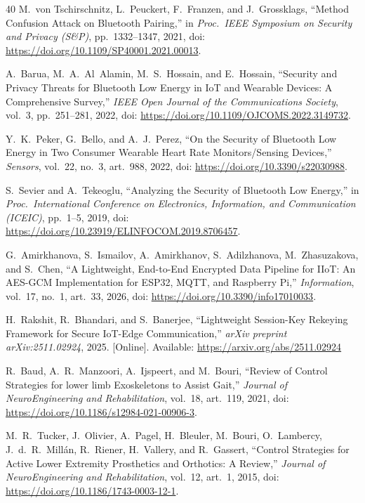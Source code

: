 \documentclass[journal]{IEEEtran}
\begin{document}
\begin{thebibliography}{40}
M.~von Tschirschnitz, L.~Peuckert, F.~Franzen, and J.~Grossklags, ``Method Confusion Attack on Bluetooth Pairing,'' in \emph{Proc.\ IEEE Symposium on Security and Privacy (S\&P)}, pp.~1332--1347, 2021, doi: \url{https://doi.org/10.1109/SP40001.2021.00013}.

A.~Barua, M.~A.~Al~Alamin, M.~S.~Hossain, and E.~Hossain, ``Security and Privacy Threats for Bluetooth Low Energy in IoT and Wearable Devices: A Comprehensive Survey,'' \emph{IEEE Open Journal of the Communications Society}, vol.~3, pp.~251--281, 2022, doi: \url{https://doi.org/10.1109/OJCOMS.2022.3149732}.

Y.~K.~Peker, G.~Bello, and A.~J.~Perez, ``On the Security of Bluetooth Low Energy in Two Consumer Wearable Heart Rate Monitors/Sensing Devices,'' \emph{Sensors}, vol.~22, no.~3, art.~988, 2022, doi: \url{https://doi.org/10.3390/s22030988}.

S.~Sevier and A.~Tekeoglu, ``Analyzing the Security of Bluetooth Low Energy,'' in \emph{Proc.\ International Conference on Electronics, Information, and Communication (ICEIC)}, pp.~1--5, 2019, doi: \url{https://doi.org/10.23919/ELINFOCOM.2019.8706457}.

G.~Amirkhanova, S.~Ismailov, A.~Amirkhanov, S.~Adilzhanova, M.~Zhasuzakova, and S.~Chen, ``A Lightweight, End-to-End Encrypted Data Pipeline for IIoT: An AES-GCM Implementation for ESP32, MQTT, and Raspberry Pi,'' \emph{Information}, vol.~17, no.~1, art.~33, 2026, doi: \url{https://doi.org/10.3390/info17010033}.


H.~Rakshit, R.~Bhandari, and S.~Banerjee, ``Lightweight Session-Key Rekeying Framework for Secure IoT-Edge Communication,'' \emph{arXiv preprint arXiv:2511.02924}, 2025. [Online]. Available: \url{https://arxiv.org/abs/2511.02924}


R.~Baud, A.~R.~Manzoori, A.~Ijspeert, and M.~Bouri, ``Review of Control Strategies for lower limb Exoskeletons to Assist Gait,'' \emph{Journal of NeuroEngineering and Rehabilitation}, vol.~18, art.~119, 2021, doi: \url{https://doi.org/10.1186/s12984-021-00906-3}.

M.~R.~Tucker, J.~Olivier, A.~Pagel, H.~Bleuler, M.~Bouri, O.~Lambercy, J.~d.~R.~Millán, R.~Riener, H.~Vallery, and R.~Gassert, ``Control Strategies for Active Lower Extremity Prosthetics and Orthotics: A Review,'' \emph{Journal of NeuroEngineering and Rehabilitation}, vol.~12, art.~1, 2015, doi: \url{https://doi.org/10.1186/1743-0003-12-1}.


\end{thebibliography}
\end{document}
